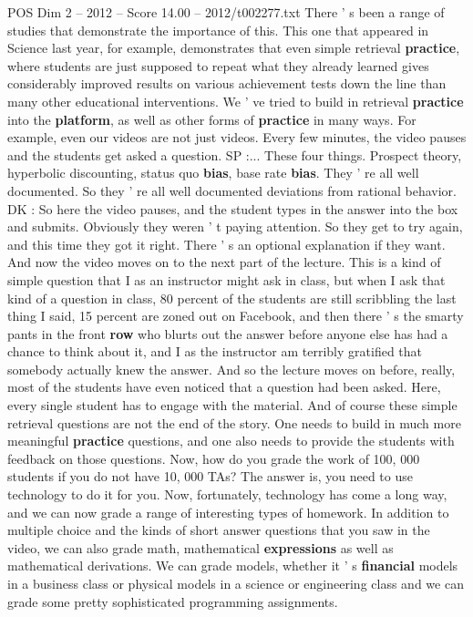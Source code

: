 \begin{textsample}{POS Dim 2 – 2012 – Score 14.00 – 2012/t002277.txt}
There ' s been a range of studies that demonstrate the importance of this.
This one that appeared in Science last year, for example, demonstrates that even simple retrieval \textbf{practice}, where students are just supposed to repeat what they already learned gives considerably improved results on various achievement tests down the line than many other educational interventions.
We ' ve tried to build in retrieval \textbf{practice} into the \textbf{platform}, as well as other forms of \textbf{practice} in many ways.
For example, even our videos are not just videos.
Every few minutes, the video pauses and the students get asked a question.
SP :...
These four things.
Prospect theory, hyperbolic discounting, status quo \textbf{bias}, base rate \textbf{bias}.
They ' re all well documented.
So they ' re all well documented deviations from rational behavior.
DK : So here the video pauses, and the student types in the answer into the box and submits.
Obviously they weren ' t paying attention.
So they get to try again, and this time they got it right.
There ' s an optional explanation if they want.
And now the video moves on to the next part of the lecture.
This is a kind of simple question that I as an instructor might ask in class, but when I ask that kind of a question in class, 80 percent of the students are still scribbling the last thing I said, 15 percent are zoned out on Facebook, and then there ' s the smarty pants in the front \textbf{row} who blurts out the answer before anyone else has had a chance to think about it, and I as the instructor am terribly gratified that somebody actually knew the answer.
And so the lecture moves on before, really, most of the students have even noticed that a question had been asked.
Here, every single student has to engage with the material.
And of course these simple retrieval questions are not the end of the story.
One needs to build in much more meaningful \textbf{practice} questions, and one also needs to provide the students with feedback on those questions.
Now, how do you grade the work of 100, 000 students if you do not have 10, 000 TAs?
The answer is, you need to use technology to do it for you.
Now, fortunately, technology has come a long way, and we can now grade a range of interesting types of homework.
In addition to multiple choice and the kinds of short answer questions that you saw in the video, we can also grade math, mathematical \textbf{expressions} as well as mathematical derivations.
We can grade models, whether it ' s \textbf{financial} models in a business class or physical models in a science or engineering class and we can grade some pretty sophisticated programming assignments.

\end{textsample}
